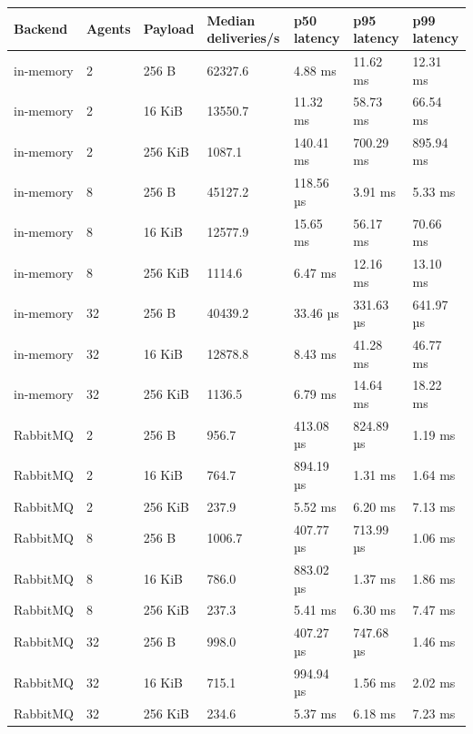 \begin{tabular}{lllllll}
\hline
Backend & Agents & Payload & Median deliveries/s & p50 latency & p95 latency & p99 latency \\
\hline
in-memory & 2 & 256 B & 62327.6 & 4.88 ms & 11.62 ms & 12.31 ms \\
in-memory & 2 & 16 KiB & 13550.7 & 11.32 ms & 58.73 ms & 66.54 ms \\
in-memory & 2 & 256 KiB & 1087.1 & 140.41 ms & 700.29 ms & 895.94 ms \\
in-memory & 8 & 256 B & 45127.2 & 118.56 µs & 3.91 ms & 5.33 ms \\
in-memory & 8 & 16 KiB & 12577.9 & 15.65 ms & 56.17 ms & 70.66 ms \\
in-memory & 8 & 256 KiB & 1114.6 & 6.47 ms & 12.16 ms & 13.10 ms \\
in-memory & 32 & 256 B & 40439.2 & 33.46 µs & 331.63 µs & 641.97 µs \\
in-memory & 32 & 16 KiB & 12878.8 & 8.43 ms & 41.28 ms & 46.77 ms \\
in-memory & 32 & 256 KiB & 1136.5 & 6.79 ms & 14.64 ms & 18.22 ms \\
RabbitMQ & 2 & 256 B & 956.7 & 413.08 µs & 824.89 µs & 1.19 ms \\
RabbitMQ & 2 & 16 KiB & 764.7 & 894.19 µs & 1.31 ms & 1.64 ms \\
RabbitMQ & 2 & 256 KiB & 237.9 & 5.52 ms & 6.20 ms & 7.13 ms \\
RabbitMQ & 8 & 256 B & 1006.7 & 407.77 µs & 713.99 µs & 1.06 ms \\
RabbitMQ & 8 & 16 KiB & 786.0 & 883.02 µs & 1.37 ms & 1.86 ms \\
RabbitMQ & 8 & 256 KiB & 237.3 & 5.41 ms & 6.30 ms & 7.47 ms \\
RabbitMQ & 32 & 256 B & 998.0 & 407.27 µs & 747.68 µs & 1.46 ms \\
RabbitMQ & 32 & 16 KiB & 715.1 & 994.94 µs & 1.56 ms & 2.02 ms \\
RabbitMQ & 32 & 256 KiB & 234.6 & 5.37 ms & 6.18 ms & 7.23 ms \\
\hline
\end{tabular}
